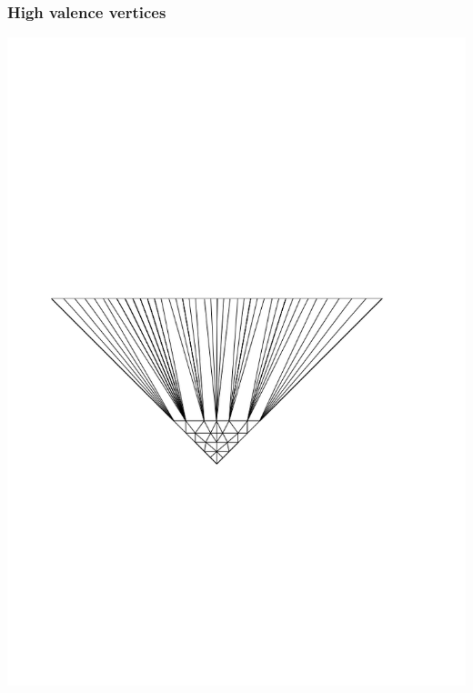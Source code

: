 \documentclass[14pt]{beamer}
\begin{document}
\begin{frame}
\frametitle{High valence vertices}
\begin{center}
\includegraphics[scale=0.6, trim = 0 0 0 250]{HV_4.png}
\end{center}
\end{frame}
\end{document}
